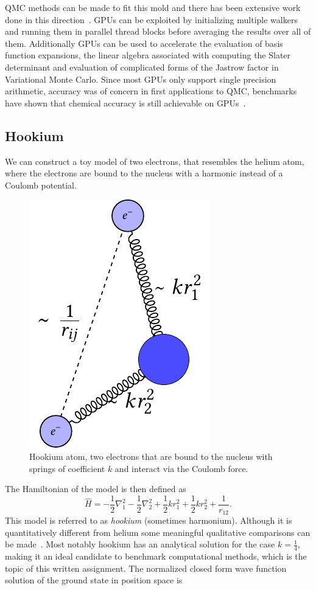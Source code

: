 \documentclass[final,3p,times,twocolumn]{elsarticle}
\begin{document}
	QMC methods can be made to fit this mold and there has been extensive work done in this direction~\cite{anderson2007quantum, meredith2009accuracy, esler2010accelerating}. GPUs can be exploited by initializing multiple walkers and running them in parallel thread blocks before averaging the results over all of them. Additionally GPUs can be used to accelerate the evaluation of basis function expansions, the linear algebra associated with computing the Slater determinant and evaluation of complicated forms of the Jastrow factor in Variational Monte Carlo. Since most GPUs only support single precision arithmetic, accuracy was of concern in first applications to QMC, benchmarks have shown that chemical accuracy is still achievable on GPUs~\cite{anderson1975random, meredith2009accuracy}. 
	
	
	\subsection{Hookium}
	We can construct a toy model of two electrons, that resembles the helium atom, where the electrons are bound to the nucleus with a harmonic instead of a Coulomb potential. 
	\begin{figure}[h]
		\centering
		\includegraphics[width=0.35\linewidth]{../diagrams/Hookium/hookium_diagram}
		\caption{Hookium atom, two electrons that are bound to the nucleus with springs of coefficient $k$ and interact via the Coulomb force.}
		\label{fig:hookiumdiagram}
	\end{figure}
	The Hamiltonian of the model is then defined as 
	\begin{equation}
		\hat{H}=-\frac{1}{2} \nabla_{1}^{2}-\frac{1}{2} \nabla_{2}^{2}+\frac{1}{2} k r_{1}^{2}+\frac{1}{2} k r_{2}^{2}+\frac{1}{r_{12}}.
	\end{equation}
	This model is referred to as \emph{hookium} (sometimes harmonium). Although it is quantitatively different from helium some meaningful qualitative comparisons can be made~\cite{ONeill2003wave}. Most notably hookium has an analytical solution for the case $k=\frac{1}{4}$, making it an ideal candidate to benchmark computational methods, which is the topic of this written assignment. The normalized closed form wave function solution of the ground state in position space is
\end{document}
